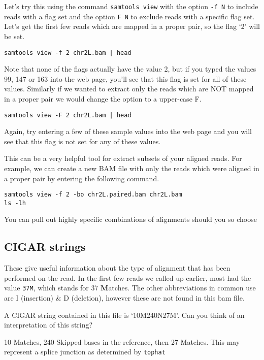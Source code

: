\begin{steps}
Let's try this using the command \texttt{samtools view} with the option \texttt{-f N} to include reads with a flag set and the option \texttt{F N} to exclude reads with a specific flag set.
Let's get the first few reads which are mapped in a proper pair, so the flag `2' will be set.\\
\begin{lstlisting}
samtools view -f 2 chr2L.bam | head
\end{lstlisting}
Note that none of the flags actually have the value 2, but if you typed the values 99, 147 or 163 into the web page, you'll see that this flag is set for all of these values.
Similarly if we wanted to extract only the reads which are NOT mapped in a proper pair we would change the option to a upper-case F.
\begin{lstlisting}
samtools view -F 2 chr2L.bam | head
\end{lstlisting}
Again, try entering a few of these sample values into the web page and you will see that this flag is not set for any of these values.
\end{steps}

\begin{information}
This can be a very helpful tool for extract subsets of your aligned reads.
For example, we can create a new BAM file with only the reads which were aligned in a proper pair by entering the following command.
\begin{lstlisting}
samtools view -f 2 -bo chr2L.paired.bam chr2L.bam
ls -lh
\end{lstlisting}
You can pull out highly specific combinations of alignments should you so choose
\end{information}


\subsection{CIGAR strings}
\begin{note}
These give useful information about the type of alignment that has been performed on the read.
In the first few reads we called up earlier, most had the value \texttt{37M}, which stands for 37 \textbf{M}atches.
The other abbreviations in common use are I (insertion) \& D (deletion), however these are not found in this bam file.
\end{note}

\begin{questions}
A CIGAR string contained in this file is `10M240N27M'.
Can you think of an interpretation of this string? \\
\begin{answer}
10 Matches, 240 Skipped bases in the reference, then 27 Matches.
This may represent a splice junction as determined by \texttt{tophat}
\end{answer}
\end{questions}

